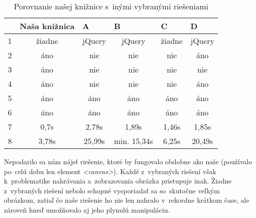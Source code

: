 \begin{table}[!htb]
	\centering
	\begin{tabular}{@{}|l|c|c|c|c|c|@{}}
	\toprule
		  		   & \multicolumn{1}{l|}{Naša knižnica} & \multicolumn{1}{l|}{A} & \multicolumn{1}{l|}{B} & \multicolumn{1}{l|}{C} & \multicolumn{1}{l|}{D} \\ \midrule
	1              & žiadne                & jQuery                 & jQuery                 & žiadne                 & jQuery                 \\ \midrule
	2 		       & áno                   & nie                    & nie                    & nie                    & áno                    \\ \midrule
	3  			   & áno                   & nie                    & nie                    & nie                    & nie                    \\ \midrule
	4			   & áno                   & nie                    & nie                    & nie                    & áno                    \\ \midrule
	5		       & áno                   & áno                    & áno                    & áno                    & áno                    \\ \midrule
	6              & áno                   & áno                    & áno                    & áno                    & áno                    \\ \midrule
	7 			   & 0,7s                  & 2,78s                  & 1,89s                  & 1,46s                  & 1,85s                  \\ \midrule
	8   		   & 3,78s                 & 25,99s                 & min. 15,34s 			 & 6,25s                  & 20,49s                 \\ \bottomrule
	\end{tabular}
	\caption{Porovnanie našej knižnice s~inými vybranými riešeniami}
	\label{my-label}
\end{table}

Nepodarilo sa nám nájsť riešenie, ktoré by fungovalo obdobne ako naše (používalo po~celú dobu len element \emph{<canvas>}). Každé z~vybraných riešení však k~problematike nahrávania a~zobrazovania obrázka pristupuje inak. Žiadne z~vybraných riešení nebolo schopné vysporiadať sa so~skutočne veľkým obrázkom, zatiaľ čo naše riešenie ho nie len nahralo v~rekordne krátkom čase, ale zároveň hneď umožňovalo aj jeho plynulú manipuláciu.